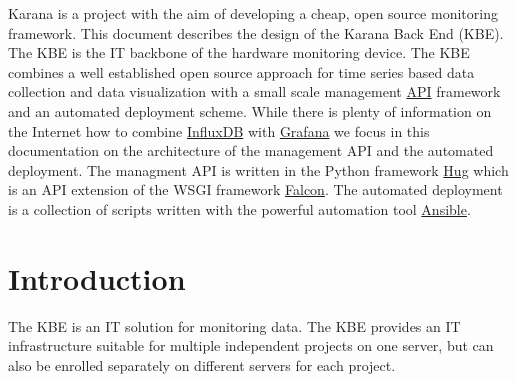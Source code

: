 \documentclass[draft=false,
10pt, %
a4paper, %
oneside, %
headinclude,footinclude, %
]{scrartcl}
\begin{document}
Karana is a project with the aim of developing a cheap, open source monitoring framework. This document describes the design of the Karana Back End (KBE). The KBE is the IT backbone of the hardware monitoring device. The KBE combines a well established open source approach for time series based data collection and data visualization with a small scale management \href{http://www.restapitutorial.com/}{API} framework and an automated deployment scheme. While there is plenty of information on the Internet how to combine \href{https://www.influxdata.com/}{InfluxDB} with \href{http://grafana.org/}{Grafana} we focus in this documentation on the architecture of the management API and the automated deployment. The managment API is written in the Python framework \href{http://www.hug.rest/}{Hug} which is an API extension of the WSGI framework \href{http://falconframework.org/}{Falcon}. The automated deployment is a collection of scripts written with the powerful automation tool \href{https://www.ansible.com}{Ansible}. 

{\let\thefootnote\relax{}}



\newpage %


\section{Introduction}

The KBE is an IT solution for monitoring data. The KBE provides an IT infrastructure suitable for multiple independent projects on one server, but can also be enrolled separately on different servers for each project. 
\end{document}
